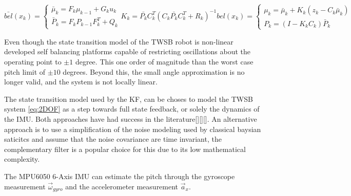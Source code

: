         \begin{subequations}
            \begin{equation}
                \bar{bel}(x_k) = \begin{cases}
                        \bar{\mu}_k = F_k \mu_{k-1} + G_k u_k \\
                        \bar{P}_k = F_k P_{k-1} F_k^T + Q_k
                        \end{cases}
                \label{eq:KalmanPredict}
            \end{equation}
            \begin{equation}
                K_k = \bar{P_k} C_k^T \left(C_k \bar{P_k} C_k^T + R_k \right)^{-1}
                \label{eq:KalmanGain}
            \end{equation}
            \begin{equation}
            bel(x_k) = \begin{cases}
                \mu_k = \bar{\mu}_k + K_k \left(z_k - C_k \bar{\mu}_k \right) \\
                P_k = \left(I - K_k C_k \right) \bar{P}_k
            \end{cases}
            \label{eq:KalmanUpdate}
            \end{equation}
            \label{eq:KalmanAlgorithm}
        \end{subequations}
     
        Even though the state transition model of the TWSB robot is non-linear
        \cite{ooi2003balancing} 
        developed self balancing platforms capable of restricting oscillations about the 
        operating point to $±1$ degree. This one order of magnitude than the worst case pitch limit of $±10$ degrees.
        Beyond this, the small angle approximation is no longer valid, and the system is not locally linear. 

        The state transition model used by the KF, can be choses to model the TWSB system \ref{eq:2DOF} as a step towards 
        full state feedback, or solely the dynamics of the IMU.  Both approaches have had success in the literature[][][]. 
        An alternative approach is to use a simplification of the noise modeling used by classical baysian saticitcs and 
        assume that the noise covariance are time invariant, the complementary filter \cite{ComplimentaryKalman} 
        is a popular choice for this due to its low mathematical complexity. 
     
        The MPU6050 6-Axis IMU can estimate the pitch through the gyroscope measurement $\vec\omega_{gyro}$ and the accelerometer measurement $\vec a_{x}$.

